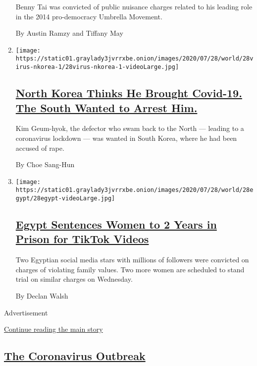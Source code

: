 \begin{enumerate}
  Benny Tai was convicted of public nuisance charges related to his
  leading role in the 2014 pro-democracy Umbrella Movement.

  By Austin Ramzy and Tiffany May
\item
  \texttt{[image: https://static01.graylady3jvrrxbe.onion/images/2020/07/28/world/28virus-nkorea-1/28virus-nkorea-1-videoLarge.jpg]}

  \hypertarget{north-korea-thinks-he-brought-covid-19-the-south-wanted-to-arrest-him}{%
  \subsection{\texorpdfstring{\href{/2020/07/28/world/asia/north-korea-defector-coronavirus.html}{North
  Korea Thinks He Brought Covid-19. The South Wanted to Arrest
  Him.}}{North Korea Thinks He Brought Covid-19. The South Wanted to Arrest Him.}}\label{north-korea-thinks-he-brought-covid-19-the-south-wanted-to-arrest-him}}

  Kim Geum-hyok, the defector who swam back to the North --- leading to
  a coronavirus lockdown --- was wanted in South Korea, where he had
  been accused of rape.

  By Choe Sang-Hun
\item
  \texttt{[image: https://static01.graylady3jvrrxbe.onion/images/2020/07/28/world/28egypt/28egypt-videoLarge.jpg]}

  \hypertarget{egypt-sentences-women-to-2-years-in-prison-for-tiktok-videos}{%
  \subsection{\texorpdfstring{\href{/2020/07/28/world/middleeast/egypt-women-tiktok-prison.html}{Egypt
  Sentences Women to 2 Years in Prison for TikTok
  Videos}}{Egypt Sentences Women to 2 Years in Prison for TikTok Videos}}\label{egypt-sentences-women-to-2-years-in-prison-for-tiktok-videos}}

  Two Egyptian social media stars with millions of followers were
  convicted on charges of violating family values. Two more women are
  scheduled to stand trial on similar charges on Wednesday.

  By Declan Walsh
\end{enumerate}

Advertisement

\protect\hyperlink{after-mid1}{Continue reading the main story}

\hypertarget{the-coronavirus-outbreak}{%
\subsection{\texorpdfstring{\href{/news-event/coronavirus}{The
Coronavirus
Outbreak}}{The Coronavirus Outbreak}}\label{the-coronavirus-outbreak}}


